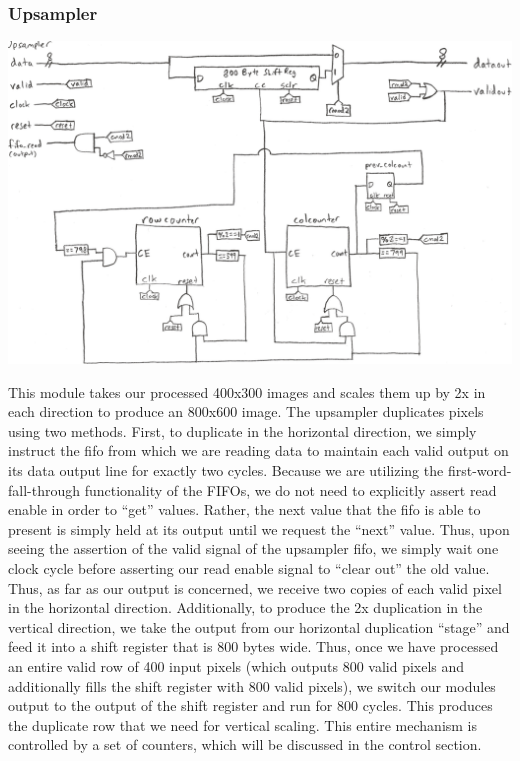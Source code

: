 \documentclass[12pt]{article}
\begin{document}
\subsubsection{Upsampler}

\includegraphics[width=\textwidth]{processed_image_pngs/Upsampler.png}

This module takes our processed 400x300 images and scales them up by 2x in each
direction to produce an 800x600 image. The upsampler duplicates pixels using 
two methods. First, to duplicate in the horizontal direction, we simply instruct
the fifo from which we are reading data to maintain each valid output on its
data output line for exactly two cycles. Because we are utilizing the 
first-word-fall-through functionality of the FIFOs, we do not need to explicitly 
assert read enable in order to ``get'' values. Rather, the next value that the
fifo is able to present is simply held at its output until we request the ``next'' value.
Thus, upon seeing the assertion of the valid signal of the upsampler fifo, we simply
wait one clock cycle before asserting our read enable signal to ``clear out'' the old
value. Thus, as far as our output is concerned, we receive two copies of each valid
pixel in the horizontal direction. Additionally, to produce the 2x duplication
in the vertical direction, we take the output from our horizontal duplication ``stage''
and feed it into a shift register that is 800 bytes wide. Thus, once we have
processed an entire valid row of 400 input pixels (which outputs 800 valid pixels and 
additionally fills the shift register with 800 valid pixels), we switch our modules 
output to the output of the shift register and run for 800 cycles. This produces
the duplicate row that we need for vertical scaling. This entire mechanism is
controlled by a set of counters, which will be discussed in the control section.
\end{document}
